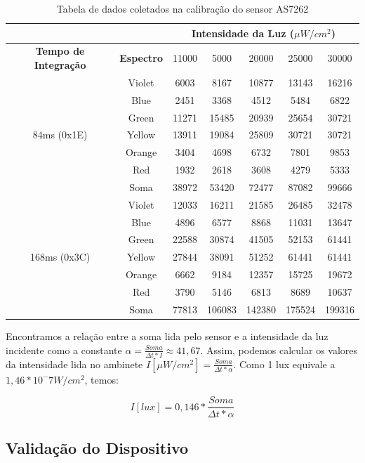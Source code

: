 \documentclass[../monografia.tex]{subfiles}
\begin{document}
\begin{table}[h]
\centering
\begin{tabular}{ |c|c|c|c|c|c|c| }
	\hline
	\multicolumn{2}{|c|}{} & \multicolumn{5}{|c|}{\textbf{Intensidade da Luz} ($\mu W/cm^2$)} \\
	\hline
	\textbf{Tempo de Integração} & \textbf{Espectro} & 11000	& 5000 & 20000 & 25000 & 30000 \\
	\hline
	\hline
	\multirow{7}{3em}{84ms (0x1E)} & Violet & 6003&8167&10877&13143 & 16216 \\
	& Blue	&2451	&3368	&4512	&5484	&6822 \\
	& Green	&11271	&15485	&20939	&25654	&30721 \\
	& Yellow &13911	&19084	&25809	&30721	&30721 \\
	& Orange &3404	&4698	&6732	&7801	&9853 \\
	& Red	&1932	&2618	&3608	&4279	&5333 \\
	\hline
	& Soma	&38972	&53420	&72477	&87082	&99666 \\
	\hline
	\multirow{7}{3em}{168ms (0x3C)} & Violet & 12033&	16211&	21585&	26485&	32478\\
	&Blue	&4896	&6577	&8868	&11031	&13647 \\
	&Green	&22588	&30874	&41505	&52153	&61441 \\
	&Yellow	&27844	&38091	&51252	&61441	&61441 \\
	&Orange	&6662	&9184	&12357	&15725	&19672 \\
	&Red	&3790	&5146	&6813	&8689	&10637 \\
	\hline
	&Soma	&77813	&106083	&142380	&175524	&199316 \\
	\hline
\end{tabular}
\caption{Tabela de dados coletados na calibração do sensor AS7262}
\label{table:tabela-luz}
\end{table}
\hfill \break

Encontramos a relação entre a soma lida pelo sensor e a intensidade da luz incidente como a constante $\alpha = \frac{Soma}{\Delta t * I} \approx 41,67$. Assim, podemos calcular os valores da intensidade lida no ambinete $I[\mu W/cm^2]=\frac{Soma}{\Delta t * \alpha}$. Como 1 lux equivale a $1,46*10^-7 W/cm^2$, temos: 

\[I[lux]= 0,146*\frac{Soma}{\Delta t * \alpha}\] \newpage

\subsection{Validação do Dispositivo} %
\end{document}

